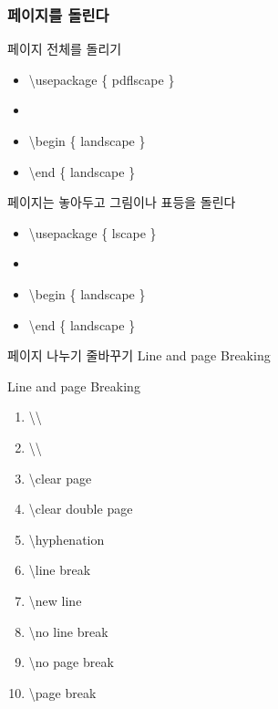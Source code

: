 \documentclass[ aspectratio=149,  14pt,blue,xcolor=pdftex,dvipsnames,table,handout,notes]{beamer}
\begin{document}
		\begin{frame}[t]
		\frametitle{페이지를 돌린다}

			\begin{block} {페이지 전체를 돌리기}
			\begin{itemize}
			\item[] \textbackslash usepackage \{ pdflscape \}
			\item[] 
			\item[] \textbackslash begin \{ landscape \}
			\item[] \textbackslash end \{ landscape \}
			\end{itemize}
			\end{block}

			\begin{block} {페이지는 놓아두고 그림이나 표등을 돌린다}
			\begin{itemize}
			\item[] \textbackslash usepackage \{ lscape \}
			\item[] 
			\item[] \textbackslash begin \{ landscape \}
			\item[] \textbackslash end \{ landscape \}
			\end{itemize}
			\end{block}


		\end{frame}




		\begin{frame}[t]{페이지 나누기 줄바꾸기 Line and page Breaking}

			\begin{block} {Line and page Breaking}
			\begin{enumerate}
			\item	\textbackslash \textbackslash 
			\item	\textbackslash \textbackslash  *
			\item	\textbackslash clear page
			\item	\textbackslash clear double page
			\item	\textbackslash hyphenation
			\item	\textbackslash line break
			\item	\textbackslash new line
			\item	\textbackslash no line break
			\item	\textbackslash no page break
			\item	\textbackslash page break
			\end{enumerate}
			\end{block}

		\end{frame}
\end{document}
